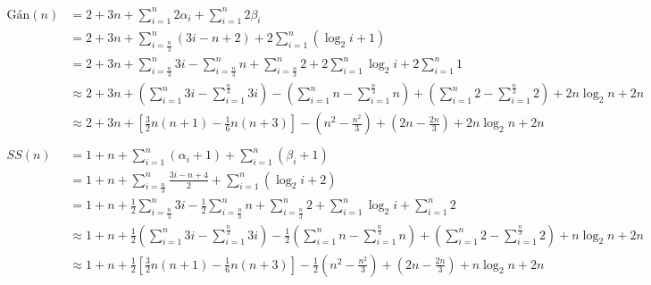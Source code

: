 \documentclass[12pt, letterpaper]{article}
\begin{document}
$ \begin{aligned}
		\text{Gán}(n) & = 2 + 3n + \sum^{n}_{i = 1} 2 \alpha_i  + \sum^{n}_{i = 1} 2 \beta_i                                                                                                                                                     \\
		              & = 2 + 3n + \sum^{n}_{i = \frac{n}{3}} (3i -n + 2) + 2 \sum^{n}_{i = 1}(\log_2 i+1)                                                                                                                                       \\
		              & = 2 + 3n + \sum^{n}_{i = \frac{n}{3}} 3i - \sum^{n}_{i = \frac{n}{3}} n + \sum^{n}_{i = \frac{n}{3}} 2 + 2 \sum^{n}_{i = 1}\log_2 i + 2 \sum^{n}_{i = 1}1                                                                \\
		              & \approx 2 + 3n + (\sum^{n}_{i = 1} 3i - \sum^{\frac{n}{3}}_{i = 1} 3i) - (\sum^{n}_{i = 1} n - \sum^{\frac{n}{3}}_{i = 1} n) + (\sum^{n}_{i = 1} 2 - \sum^{\frac{n}{3}}_{i = 1} 2) + 2n \log_2n + 2n                     \\
		              & \approx 2 + 3n + [\frac{3}{2}n(n + 1) - \frac{1}{6}n(n + 3)] - (n^2 - \frac{n^2}{3}) + (2n - \frac{2n}{3}) + 2n \log_2n + 2n                                                                                             \\
		\\SS(n) & = 1 + n + \sum^{n}_{i = 1} (\alpha_i  + 1) + \sum^{n}_{i = 1} ( \beta_i + 1)\\
		              & = 1 + n + \sum^{n}_{i = \frac{n}{3}} \frac{3i - n + 4}{2} + \sum^{n}_{i = 1} (\log_2 i + 2)                                                                                                                              \\
		              & = 1 + n + \frac{1}{2}\sum^{n}_{i = \frac{n}{3}} 3i - \frac{1}{2}\sum^{n}_{i = \frac{n}{3}} n + \sum^{n}_{i = \frac{n}{3}} 2 + \sum^{n}_{i = 1} \log_2 i + \sum^{n}_{i = 1} 2                                             \\
		              & \approx 1 + n + \frac{1}{2}(\sum^{n}_{i = 1} 3i - \sum^{\frac{n}{3}}_{i = 1} 3i) - \frac{1}{2}(\sum^{n}_{i = 1} n - \sum^{\frac{n}{3}}_{i = 1} n) + (\sum^{n}_{i = 1} 2 - \sum^{\frac{n}{3}}_{i = 1} 2) + n \log_2n + 2n \\
		              & \approx 1 + n + \frac{1}{2}[\frac{3}{2}n(n + 1) - \frac{1}{6}n(n + 3)] - \frac{1}{2}(n^2 - \frac{n^2}{3}) + (2n - \frac{2n}{3}) + n \log_2n + 2n                                                                         \\
	\end{aligned} $ \\
\end{document}
